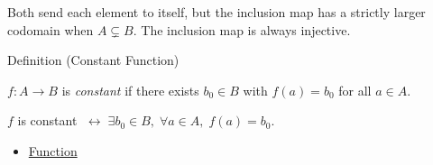 \begin{remark*}
\label{def:inclusion}
Both send each element to itself, but the inclusion map has a strictly larger
codomain when $A \subsetneq B$. The inclusion map is always injective.
\end{remark*}

\begin{definitionbox}{Definition (Constant Function)}
\begin{definition}\label{def:constant}
$f : A \to B$ is \emph{constant} if there exists $b_0 \in B$ with
$f(a) = b_0$ for all $a \in A$.
\end{definition}
\end{definitionbox}\begin{remark*}
$f$ is constant $\;\leftrightarrow\; \exists b_0 \in B,\; \forall a \in A,\; f(a) = b_0$.
\end{remark*}

\begin{dependencies}
\begin{itemize}
  \item \hyperref[def:function]{Function}
\end{itemize}
\end{dependencies}
